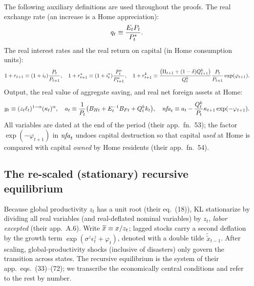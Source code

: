 The following auxiliary definitions are used throughout the proofs. The real
exchange rate (an increase is a Home appreciation):
\begin{equation}
\label{eq:rer-def}
q_t\equiv\frac{E_t P_t}{P^{*}_t}.
\end{equation}
The real interest rates and the real return on capital (in Home consumption
units):
\begin{equation}
\label{eq:returns-def}
1+r_{t+1}\equiv(1+i_t)\frac{P_t}{P_{t+1}},\quad
1+r^{*}_{t+1}\equiv(1+i^{*}_t)\frac{P^{*}_t}{P^{*}_{t+1}},\quad
1+r^{k}_{t+1}\equiv\frac{\bigl(\Pi_{t+1}+(1-\delta)Q^k_{t+1}\bigr)}{Q^k_t}\frac{P_t}{P_{t+1}}\exp(\varphi_{t+1}).
\end{equation}
Output, the real value of aggregate saving, and real net foreign assets at Home:
\begin{equation}
\label{eq:agg-def}
y_t\equiv(z_t\ell_t)^{1-\alpha}(\kappa_t)^{\alpha},\quad
a_t\equiv\frac{1}{P_t}\bigl(B_{Ht}+E_t^{-1}B_{Ft}+Q^k_t k_t\bigr),\quad
\mathit{nfa}_t\equiv a_t-\frac{Q^k_t}{P_t}\kappa_{t+1}\exp(-\varphi_{t+1}).
\end{equation}
All variables are dated at the end of the period (their app.\ fn.~53); the factor
$\exp(-\varphi_{t+1})$ in $\mathit{nfa}_t$ undoes capital destruction so that capital
\emph{used} at Home is compared with capital \emph{owned} by Home residents (their
app.\ fn.~54).

\subsection{The re-scaled (stationary) recursive equilibrium}
\label{sec:rescaled}

Because global productivity $z_t$ has a unit root (their eq.~(18)), KL stationarize
by dividing all real variables (and real-deflated nominal variables) by $z_t$,
\emph{labor excepted} (their app.\ A.6). Write $\widetilde{x}\equiv x/z_t$; lagged stocks
carry a second deflation by the growth term
$\exp(\sigma^z\epsilon^z_t+\varphi_t)$, denoted with a double tilde
$\widetilde{\widetilde{x}}_{t-1}$. After scaling, global-productivity shocks
(inclusive of disasters) only govern the transition across states. The recursive
equilibrium is the system of their app.\ eqs.~(33)--(72); we transcribe the
economically central conditions and refer to the rest by number.

